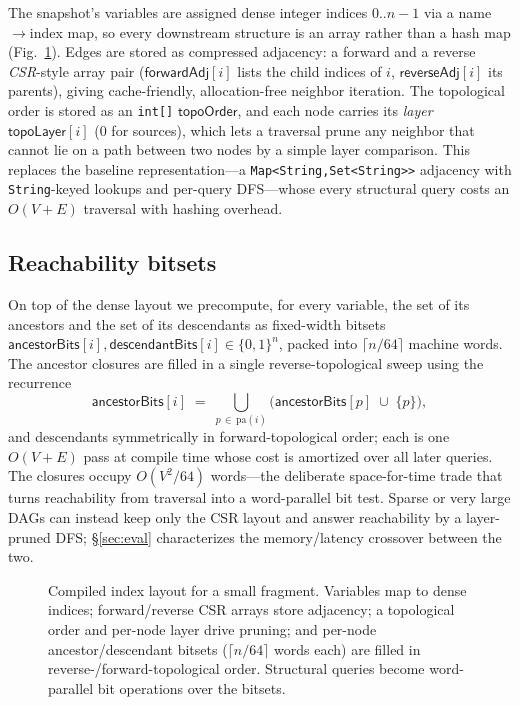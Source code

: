 The snapshot's variables are assigned dense integer indices $0..n{-}1$ via a
\textsf{name}$\to$\textsf{index} map, so every downstream structure is an array
rather than a hash map (Fig.~\ref{fig:index}). Edges are stored as compressed
adjacency: a forward and a reverse \emph{CSR}-style array pair
($\textsf{forwardAdj}[i]$ lists the child indices of $i$, $\textsf{reverseAdj}[i]$
its parents), giving cache-friendly, allocation-free neighbor iteration. The
topological order is stored as an \texttt{int[]} $\textsf{topoOrder}$, and each
node carries its \emph{layer} $\textsf{topoLayer}[i]$ (0 for sources), which lets
a traversal prune any neighbor that cannot lie on a path between two nodes by a
simple layer comparison. This replaces the baseline representation---a
\lstinline[style=causaldsl]|Map<String,Set<String>>| adjacency with
\texttt{String}-keyed lookups and per-query DFS---whose every structural query
costs an $O(V{+}E)$ traversal with hashing overhead.

\subsection{Reachability bitsets}\label{sec:index:bitsets}

On top of the dense layout we precompute, for every variable, the set of its
ancestors and the set of its descendants as fixed-width bitsets
$\textsf{ancestorBits}[i],\textsf{descendantBits}[i]\in\{0,1\}^{n}$, packed into
$\lceil n/64\rceil$ machine words. The ancestor closures are filled in a single
reverse-topological sweep using the recurrence
\[
  \textsf{ancestorBits}[i] \;=\; \bigcup_{p\,\in\,\mathrm{pa}(i)}
      \bigl(\textsf{ancestorBits}[p] \;\cup\; \{p\}\bigr),
\]
and descendants symmetrically in forward-topological order; each is one
$O(V{+}E)$ pass at compile time whose cost is amortized over all later queries.
The closures occupy $O(V^2/64)$ words---the deliberate space-for-time trade that
turns reachability from traversal into a word-parallel bit test. Sparse or very
large DAGs can instead keep only the CSR layout and answer reachability by a
layer-pruned DFS; \S\ref{sec:eval} characterizes the memory/latency crossover
between the two.

\begin{figure}[t]\centering
  \resizebox{\linewidth}{!}{}
  \caption{Compiled index layout for a small fragment. Variables map to dense
  indices; forward/reverse CSR arrays store adjacency; a topological order and
  per-node layer drive pruning; and per-node ancestor/descendant bitsets
  ($\lceil n/64\rceil$ words each) are filled in reverse-/forward-topological
  order. Structural queries become word-parallel bit operations over the
  bitsets.}
  \label{fig:index}
\end{figure}

